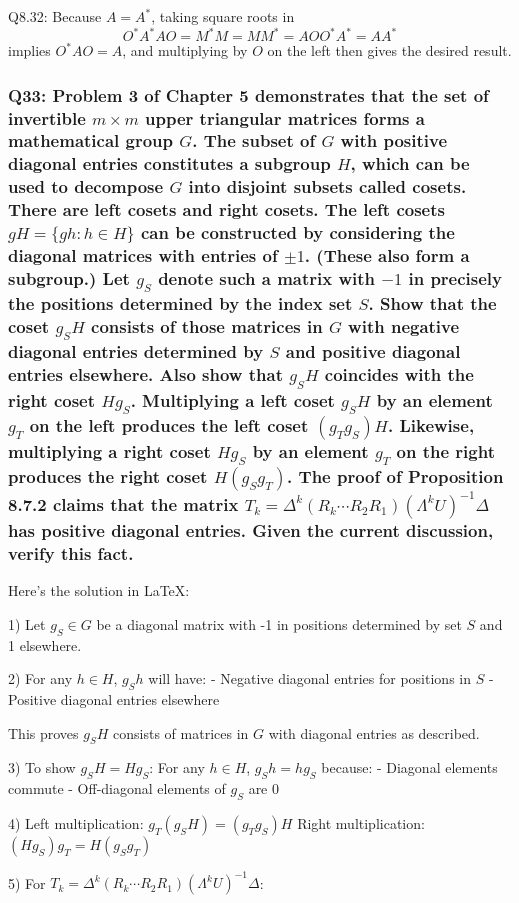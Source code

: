 \documentclass[8pt]{article}
\begin{document}
{Q8.32: Because \(A = A^*\), taking square roots in
\[
O^* A^* AO = M^* M = MM^* = AOO^* A^* = AA^*
\]
implies \(O^* AO = A\), and multiplying by \(O\) on the left then gives the desired result.

\subsubsection*{Q33: Problem 3 of Chapter 5 demonstrates that the set of invertible \(m \times m\) upper triangular matrices forms a mathematical group \(G\). The subset of \(G\) with positive diagonal entries constitutes a subgroup \(H\), which can be used to decompose \(G\) into disjoint subsets called cosets. There are left cosets and right cosets. The left cosets \(gH = \{gh : h \in H\}\) can be constructed by considering the diagonal matrices with entries of \(\pm 1\). (These also form a subgroup.) Let \(g_S\) denote such a matrix with \(-1\) in precisely the positions determined by the index set \(S\). Show that the coset \(g_SH\) consists of those matrices in \(G\) with negative diagonal entries determined by \(S\) and positive diagonal entries elsewhere. Also show that \(g_SH\) coincides with the right coset \(Hg_S\). Multiplying a left coset \(g_SH\) by an element \(g_T\) on the left produces the left coset \((g_Tg_S)H\). Likewise, multiplying a right coset \(Hg_S\) by an element \(g_T\) on the right produces the right coset \(H(g_Sg_T)\). The proof of Proposition 8.7.2 claims that the matrix \(T_k = \Delta^k (R_k \cdots R_2 R_1) (\Lambda^k U)^{-1} \Delta\) has positive diagonal entries. Given the current discussion, verify this fact.}

Here's the solution in LaTeX:

1) Let $g_S \in G$ be a diagonal matrix with -1 in positions determined by set $S$ and 1 elsewhere.

2) For any $h \in H$, $g_Sh$ will have:
   - Negative diagonal entries for positions in $S$
   - Positive diagonal entries elsewhere
   
   This proves $g_SH$ consists of matrices in $G$ with diagonal entries as described.

3) To show $g_SH = Hg_S$:
   For any $h \in H$, $g_Sh = hg_S$ because:
   - Diagonal elements commute
   - Off-diagonal elements of $g_S$ are 0

4) Left multiplication: $g_T(g_SH) = (g_Tg_S)H$
   Right multiplication: $(Hg_S)g_T = H(g_Sg_T)$

5) For $T_k = \Delta^k (R_k \cdots R_2 R_1) (\Lambda^k U)^{-1} \Delta$:
   
}
\end{document}
